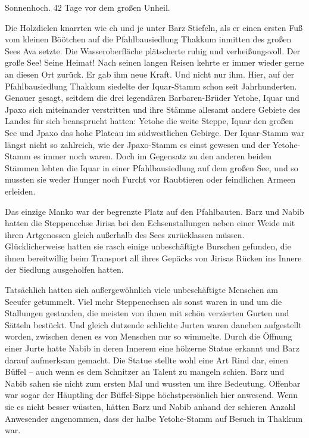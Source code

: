 Sonnenhoch. 42 Tage vor dem großen Unheil.\bigskip



Die Holzdielen knarrten wie eh und je unter Barz Stiefeln, als er einen ersten Fuß vom kleinen Böötchen auf die Pfahlbausiedlung Thakkum inmitten des großen Sees Ava setzte. Die Wasseroberfläche plätscherte ruhig und verheißungsvoll. Der große See! Seine Heimat! Nach seinen langen Reisen kehrte er immer wieder gerne an diesen Ort zurück. Er gab ihm neue Kraft. Und nicht nur ihm. Hier, auf der Pfahlbausiedlung Thakkum siedelte der Iquar-Stamm schon seit Jahrhunderten. Genauer gesagt, seitdem die drei legendären Barbaren-Brüder Yetohe, Iquar und Jpaxo sich miteinander verstritten und ihre Stämme allesamt andere Gebiete des Landes für sich beansprucht hatten: Yetohe die weite Steppe, Iquar den großen See und Jpaxo das hohe Plateau im südwestlichen Gebirge. Der Iquar-Stamm war längst nicht so zahlreich, wie der Jpaxo-Stamm es einst gewesen und der Yetohe-Stamm es immer noch waren. Doch im Gegensatz zu den anderen beiden Stämmen lebten die Iquar in einer Pfahlbausiedlung auf dem großen See, und so mussten sie weder Hunger noch Furcht vor Raubtieren oder feindlichen Armeen erleiden.

Das einzige Manko war der begrenzte Platz auf den Pfahlbauten. Barz und Nabib hatten die Steppenechse Jirisa bei den Echsenstallungen neben einer Weide mit ihren Artgenossen gleich außerhalb des Sees zurücklassen müssen. Glücklicherweise hatten sie rasch einige unbeschäftigte Burschen gefunden, die ihnen bereitwillig beim Transport all ihres Gepäcks von Jirisas Rücken ins Innere der Siedlung ausgeholfen hatten.

Tatsächlich hatten sich außergewöhnlich viele unbeschäftigte Menschen am Seeufer getummelt. Viel mehr Steppenechsen als sonst waren in und um die Stallungen gestanden, die meisten von ihnen mit schön verzierten Gurten und Sätteln bestückt. Und gleich dutzende schlichte Jurten waren daneben aufgestellt worden, zwischen denen es von Menschen nur so wimmelte. Durch die Öffnung einer Jurte hatte Nabib in deren Innerem eine hölzerne Statue erkannt und Barz darauf aufmerksam gemacht. Die Statue stellte wohl eine Art Rind dar, einen Büffel – auch wenn es dem Schnitzer an Talent zu mangeln schien. Barz und Nabib sahen sie nicht zum ersten Mal und wussten um ihre Bedeutung. Offenbar war sogar der Häuptling der Büffel-Sippe höchstpersönlich hier anwesend. Wenn sie es nicht besser wüssten, hätten Barz und Nabib anhand der schieren Anzahl Anwesender angenommen, dass der halbe Yetohe-Stamm auf Besuch in Thakkum war.

